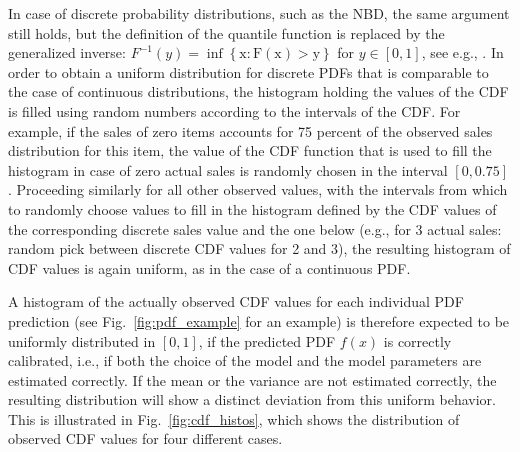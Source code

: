 \documentclass[BCOR=1mm, DIV=calc,10pt,
twoside=true,
twocolumn,
headings=normal]{scrartcl}
\newcommand{\fig}{Fig.~}
\begin{document}
In case of discrete probability distributions, such as the NBD, the same argument still holds, but the definition of the quantile function is replaced by the generalized inverse: $F^{-1}(y) = \mathrm{\inf \left \{x : F(x)>y\right  \} }$ for $y \in [0,1]$, see e.g., \cite[p. 54]{casella2002statistical}. In order to obtain a uniform distribution for discrete PDFs that is comparable to the case of continuous distributions, the histogram holding the values of the CDF is filled using random numbers according to the intervals of the CDF. For example, if the sales of zero items accounts for 75 percent of the observed sales distribution for this item, the value of the CDF function that is used to fill the histogram in case of zero actual sales is randomly chosen in the interval $[0, 0.75]$. Proceeding similarly for all other observed values, with the intervals from which to randomly choose values to fill in the histogram defined by the CDF values of the corresponding discrete sales value and the one below (e.g., for 3 actual sales: random pick between discrete CDF values for 2 and 3), the resulting histogram of CDF values is again uniform, as in the case of a continuous PDF.

A histogram of the actually observed CDF values for each individual PDF prediction (see \fig \ref{fig:pdf_example} for an example) is therefore expected to be uniformly distributed in $[0,1]$, if the predicted PDF $f(x)$ is correctly calibrated, i.e., if both the choice of the model and the model parameters are estimated correctly. If the mean or the variance are not estimated correctly, the resulting distribution will show a distinct deviation from this uniform behavior. This is illustrated in \fig \ref{fig:cdf_histos}, which shows the distribution of observed CDF values for four different cases.
\end{document}
